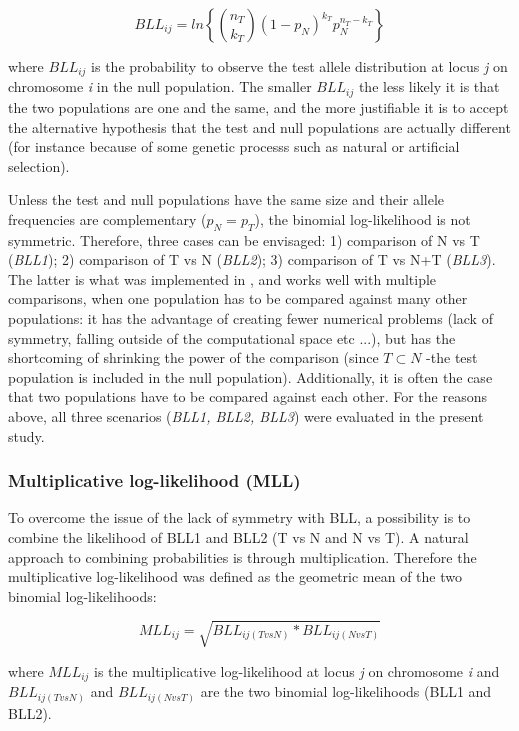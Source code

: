 \documentclass{bmcart}
\begin{document}
\begin{equation}
BLL_{ij}=ln\left\{{n_T \choose k_T} (1-p_N)^{k_T}p_N^{n_T-k_T}\right\}
\end{equation}

where $BLL_{ij}$ is the probability to observe the test allele
distribution at locus \emph{j} on chromosome \emph{i} in the null population. 
The smaller $BLL_{ij}$ the less likely it is that the two populations are
one and the same, and the more justifiable it is to accept the
alternative hypothesis that the test and null populations are actually
different (for instance because of some genetic processs such as natural or
artificial selection). 

Unless the test and null populations have the same size and their allele
frequencies are complementary ($p_N=p_T$), the binomial log-likelihood
is not symmetric. Therefore, three cases can be envisaged: 1) comparison
of N vs T (\emph{BLL1}); 2) comparison of T vs N (\emph{BLL2}); 3)
  comparison of  T vs N+T (\emph{BLL3}). The latter is what was
  implemented in \cite{stella2010identification}, and works well with
  multiple comparisons, when one population has to be compared against
  many other populations: it has the advantage
  of creating fewer numerical problems (lack of symmetry, falling
  outside of the computational space etc ...), but has the shortcoming
  of shrinking the power of the comparison (since $T \subset N$ -the test population is
  included in the null population). Additionally, it is often the case
  that two populations have to be compared against each other. For the
  reasons above, all three scenarios (\emph{BLL1, BLL2, BLL3}) were
  evaluated in the present study.

\subsubsection*{Multiplicative log-likelihood (MLL)}
To overcome the issue of the lack of symmetry with BLL, a
possibility is to combine the likelihood of BLL1 and BLL2 (T vs N
and N vs T). A natural approach to combining probabilities is through
multiplication. Therefore the multiplicative log-likelihood was defined
as the geometric mean of the two binomial log-likelihoods:

\begin{equation}
MLL_{ij} = \sqrt{BLL_{ij(TvsN)}*BLL_{ij(NvsT)}}
\end{equation}

where $MLL_{ij}$ is the multiplicative log-likelihood at locus \emph{j}
on chromosome \emph{i} and $BLL_{ij(TvsN)}$ and $BLL_{ij(NvsT)}$ are the
two binomial log-likelihoods (BLL1 and BLL2).
\end{document}
